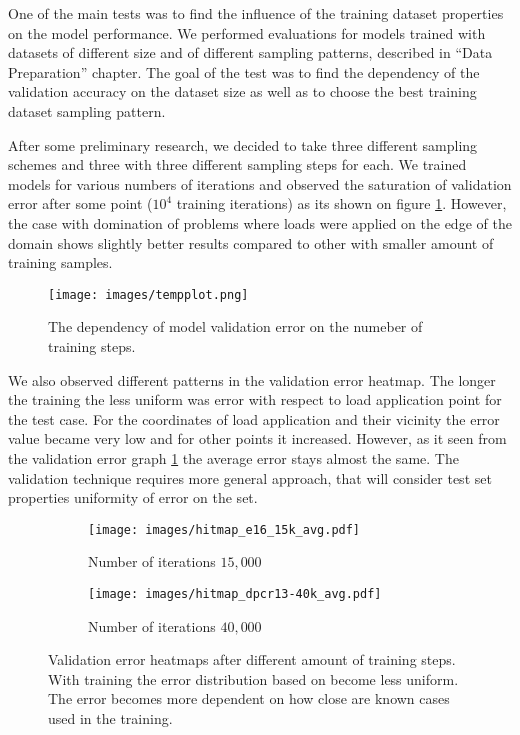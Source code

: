 One of the main tests was to find the influence of the training dataset properties on the model performance.
We performed evaluations for models trained with datasets of different size and of different sampling patterns, described in ``Data Preparation'' chapter.
The goal of the test was to find the dependency of the validation accuracy on the dataset size as well as to choose the best training dataset sampling pattern.
\medskip
 
After some preliminary research, we decided to take three different sampling schemes and three with three different sampling steps for each. 
We trained models for various numbers of iterations and observed the saturation of validation error after some point ($10^4$ training iterations) as its shown on figure \ref{fig:mse_vs_steps}.
However, the case with domination of problems where loads were applied on the edge of the domain shows slightly better results compared to other with smaller amount of training samples.
\begin{figure}[H]
	\centering
	\texttt{[image: images/tempplot.png]}
	\caption{The dependency of model validation error on the numeber of training steps.}
	\label{fig:mse_vs_steps}
\end{figure}
We also observed different patterns in the validation error heatmap.
The longer the training the less uniform was error with respect to load application point for the test case. 
For the coordinates of load application and their vicinity the error value became very low and for other points it increased. 
However, as it seen from the validation error graph \ref{fig:mse_vs_steps} the average error stays almost the same.
The validation technique requires more general approach, that will consider test set properties uniformity of error on the set.

\begin{figure}[H]
	\begin{subfigure}[b]{0.4\linewidth}
		\centering
		\texttt{[image: images/hitmap\_e16\_15k\_avg.pdf]}
		\caption{Number of iterations $15,000$}
		\label{fig:heatmaps_overfit_1}
	\end{subfigure}
	\begin{subfigure}[b]{0.4\linewidth}
		\centering
		\texttt{[image: images/hitmap\_dpcr13-40k\_avg.pdf]}
		\caption{Number of iterations $40,000$}
		\label{fig:heatmaps_overfit_2}
	\end{subfigure}
	\caption{Validation error heatmaps after different amount of training steps. With training the error distribution based on become less uniform. The error becomes more dependent on how close are known cases used in the training.}
	\label{fig:heatmaps_overfit}
\end{figure}

